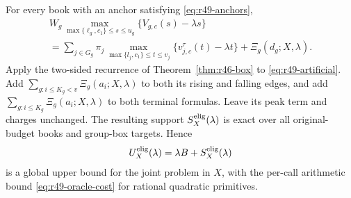 \begin{theorem}\label{thm:r49-box}
For every book with an anchor satisfying \eqref{eq:r49-anchors},
\begin{multline}\label{eq:r49-box-identity}
 W_g\max_{\max\{\ell_g,c_1\}\leq s\leq u_g}
             \{V_{g,c}(s)-\lambda s\}\\
 =\sum_{j\in G_g}\pi_j
      \max_{\max\{l_j,c_1\}\leq t\leq v_j}
             \{v_{j,c}^{\tau}(t)-\lambda t\}
       +\Xi_g(d_g;X,\lambda).
\end{multline}
Apply the two-sided recurrence of Theorem~\ref{thm:r46-box} to \eqref{eq:r49-artificial}. Add $\sum_{g:i\leq K_g<v}\Xi_g(a_i;X,\lambda)$ to both its rising and falling edges, and add $\sum_{g:i\leq K_g}\Xi_g(a_i;X,\lambda)$ to both terminal formulas. Leave its peak term and charges unchanged. The resulting support $S_X^{\rm elig}(\lambda)$ is exact over all original-budget books and group-box targets. Hence
\begin{equation}\label{eq:r49-upper}
 U_X^{\rm elig}(\lambda)=\lambda B+S_X^{\rm elig}(\lambda)
\end{equation}
is a global upper bound for the joint problem in $X$, with the per-call arithmetic bound \eqref{eq:r49-oracle-cost} for rational quadratic primitives.
\end{theorem}
